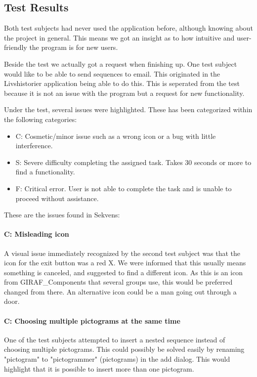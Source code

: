 \subsection{Test Results}\label{subsec:test_results}
Both test subjects had never used the application before, although knowing about the project in general. This means we got an insight as to how intuitive and user-friendly the program is for new users.

Beside the test we actually got a request when finishing up. One test subject would like to be able to send sequences to email. This originated in the Livshistorier application being able to do this. This is seperated from the test because it is not an issue with the program but a request for new functionality.

Under the test, several issues were highlighted. These has been categorized within the following categories:

\begin{itemize}
\item C: Cosmetic/minor issue such as a wrong icon or a bug with little interference.
\item S: Severe difficulty completing the assigned task. Takes 30 seconds or more to find a functionality.
\item F: Critical error. User is not able to complete the task and is unable to proceed without assistance.
\end{itemize}

These are the issues found in Sekvens:

\paragraph{C: Misleading icon}
A visual issue immediately recognized by the second test subject was that the icon for the exit button was a red X. We were informed that this usually means something is canceled, and suggested to find a different icon. As this is an icon from GIRAF\_Components that several groups use, this would be preferred changed from there. An alternative icon could be a man going out through a door.

\paragraph{C: Choosing multiple pictograms at the same time}
One of the test subjects attempted to insert a nested sequence instead of choosing multiple pictograms. This could possibly be solved easily by renaming "pictogram" to "pictogrammer" (pictograms) in the add dialog. This would highlight that it is possible to insert more than one pictogram.

